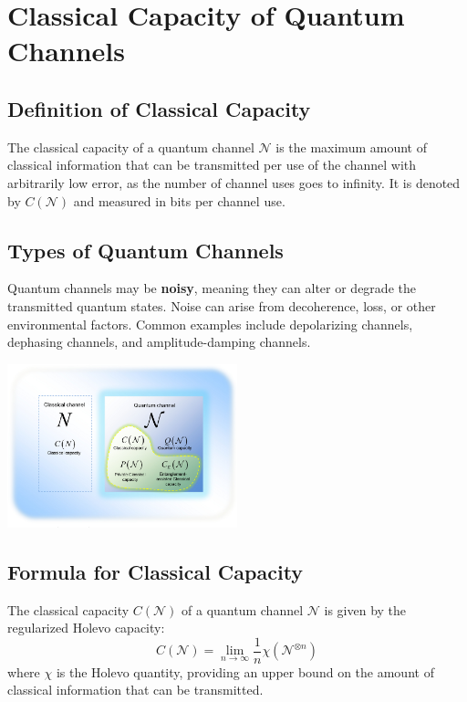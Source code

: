 \section{Classical Capacity of Quantum Channels}

\subsection{Definition of Classical Capacity}
The classical capacity of a quantum channel \( \mathcal{N} \) is the maximum amount of classical information that can be transmitted per use of the channel with arbitrarily low error, as the number of channel uses goes to infinity. It is denoted by \( C(\mathcal{N}) \) and measured in bits per channel use.

\subsection{Types of Quantum Channels}
Quantum channels may be \textbf{noisy}, meaning they can alter or degrade the transmitted quantum states. Noise can arise from decoherence, loss, or other environmental factors. Common examples include depolarizing channels, dephasing channels, and amplitude-damping channels.

\begin{center}
    \includegraphics[width=0.5\textwidth]{figures/properties_channels.png}
\end{center}

\subsection{Formula for Classical Capacity}
The classical capacity \( C(\mathcal{N}) \) of a quantum channel \( \mathcal{N} \) is given by the regularized Holevo capacity:
\begin{equation}
    C(\mathcal{N}) = \lim_{n \to \infty} \frac{1}{n} \chi\left(\mathcal{N}^{\otimes n}\right)
\end{equation}
where \( \chi \) is the Holevo quantity, providing an upper bound on the amount of classical information that can be transmitted.

